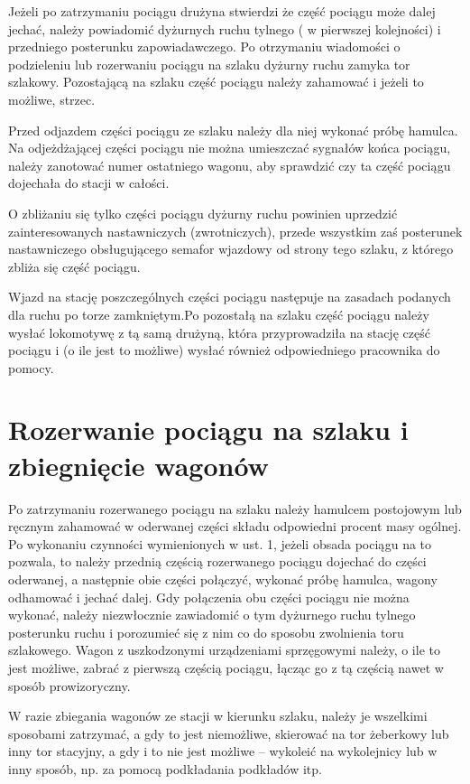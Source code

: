Jeżeli po zatrzymaniu pociągu drużyna stwierdzi że część pociągu może dalej jechać, należy powiadomić dyżurnych ruchu tylnego ( w pierwszej kolejności) i przedniego posterunku zapowiadawczego. Po otrzymaniu wiadomości o podzieleniu lub rozerwaniu pociągu na szlaku dyżurny ruchu zamyka tor szlakowy. Pozostającą na szlaku część pociągu należy zahamować i jeżeli to możliwe, strzec.

Przed odjazdem części pociągu ze szlaku należy dla niej wykonać próbę hamulca. Na odjeżdżającej części pociągu nie można umieszczać sygnałów końca pociągu, należy zanotować numer ostatniego wagonu, aby sprawdzić czy ta część pociągu dojechała do stacji w całości.

O zbliżaniu się tylko części pociągu dyżurny ruchu powinien uprzedzić zainteresowanych nastawniczych (zwrotniczych), przede wszystkim zaś posterunek nastawniczego obsługującego semafor wjazdowy od strony tego szlaku, z którego zbliża
się część pociągu.

Wjazd na stację poszczególnych części pociągu następuje na zasadach podanych dla ruchu po torze zamkniętym.Po pozostałą na szlaku część pociągu należy wysłać lokomotywę z tą samą drużyną, która przyprowadziła na stację część pociągu i (o
ile jest to możliwe) wysłać również odpowiedniego pracownika do pomocy.

\section{Rozerwanie pociągu na szlaku i zbiegnięcie wagonów}

Po zatrzymaniu rozerwanego pociągu na szlaku należy hamulcem postojowym lub ręcznym zahamować w oderwanej części składu odpowiedni procent masy ogólnej. Po wykonaniu czynności wymienionych w ust. 1, jeżeli obsada pociągu na to pozwala, to należy przednią częścią rozerwanego pociągu dojechać do części oderwanej, a następnie obie części połączyć, wykonać próbę hamulca, wagony odhamować i jechać dalej. Gdy połączenia obu części pociągu nie można wykonać, należy niezwłocznie zawiadomić o tym dyżurnego ruchu tylnego posterunku ruchu i porozumieć się z nim co do sposobu zwolnienia toru szlakowego. Wagon z uszkodzonymi urządzeniami sprzęgowymi należy, o ile to jest możliwe, zabrać z pierwszą częścią pociągu, łącząc go z tą częścią nawet w sposób prowizoryczny.

W razie zbiegania wagonów ze stacji w kierunku szlaku, należy je wszelkimi sposobami zatrzymać, a gdy to jest niemożliwe, skierować na tor żeberkowy lub inny tor stacyjny, a gdy i to nie jest możliwe – wykoleić na wykolejnicy lub w inny sposób, np. za pomocą podkładania podkładów itp. 


